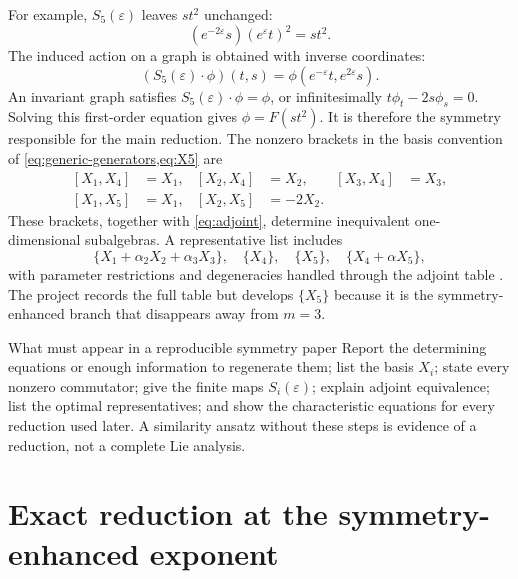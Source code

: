 \documentclass[11pt]{article}
\newcommand{\eps}{\varepsilon}
\begin{document}
For example, $S_5(\eps)$ leaves $st^2$ unchanged:
\begin{equation}
 (e^{-2\eps}s)(e^\eps t)^2=st^2.
\end{equation}
The induced action on a graph is obtained with inverse coordinates:
\begin{equation}
 (S_5(\eps)\cdot\phi)(t,s)
 =\phi(e^{-\eps}t,e^{2\eps}s).
 \label{eq:solution-action}
\end{equation}
An invariant graph satisfies $S_5(\eps)\cdot\phi=\phi$, or infinitesimally
$t\phi_t-2s\phi_s=0$.  Solving this first-order equation gives
$\phi=F(st^2)$.
It is therefore the symmetry responsible for the main reduction.  The nonzero brackets in the basis convention of \cref{eq:generic-generators,eq:X5} are
\begin{equation}
\begin{aligned}
 [X_1,X_4]&=X_1, & [X_2,X_4]&=X_2, & [X_3,X_4]&=X_3,\\
 [X_1,X_5]&=X_1, & [X_2,X_5]&=-2X_2.
\end{aligned}
 \label{eq:brackets}
\end{equation}
These brackets, together with \cref{eq:adjoint}, determine inequivalent one-dimensional subalgebras.  A representative list includes
\begin{equation}
 \{X_1+\alpha_2X_2+\alpha_3X_3\},\quad
 \{X_4\},\quad \{X_5\},\quad \{X_4+\alpha X_5\},
 \label{eq:optimal}
\end{equation}
with parameter restrictions and degeneracies handled through the adjoint table \cite{paliathanasis2026}.  The project records the full table but develops $\{X_5\}$ because it is the symmetry-enhanced branch that disappears away from $m=3$.

\begin{instruction}{What must appear in a reproducible symmetry paper}
Report the determining equations or enough information to regenerate them; list the basis $X_i$; state every nonzero commutator; give the finite maps $S_i(\eps)$; explain adjoint equivalence; list the optimal representatives; and show the characteristic equations for every reduction used later.  A similarity ansatz without these steps is evidence of a reduction, not a complete Lie analysis.
\end{instruction}

\section{Exact reduction at the symmetry-enhanced exponent}
\end{document}
